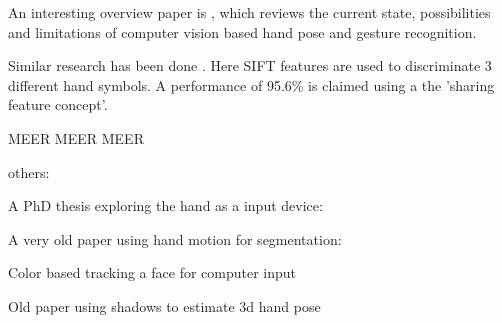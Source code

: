 An interesting overview paper is \cite{Erol2007}, which reviews the current state, possibilities and limitations of computer vision based hand pose and gesture recognition.


Similar research has been done \cite{Wang2007}. Here SIFT features are used to discriminate 3 different hand symbols. A performance of 95.6\% is claimed using a the 'sharing feature concept'.


MEER MEER MEER




others:

A PhD thesis exploring the hand as a input device: \cite{Sturman1992}

A very old paper using hand motion for segmentation: \cite{Cui1996}

Color based tracking a face for computer input \cite{Bradski1998}

Old paper using shadows to estimate 3d hand pose \cite{Segen1999}




